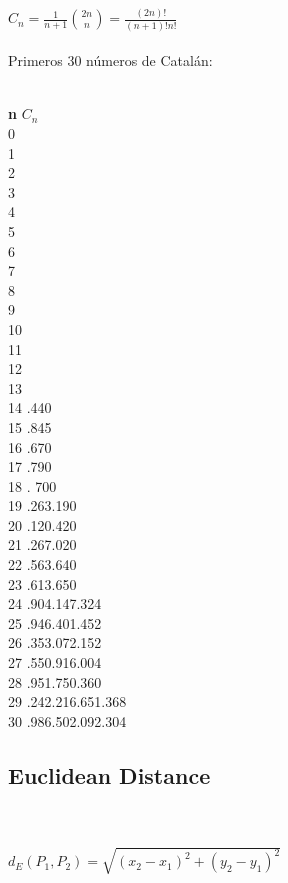 \documentclass[11pt,letterpaper,twocolumn,twosided]{article}
\begin{document}
{\LARGE $C_{n} = \frac{1}{n+1}\binom{2n}{n} = \frac{(2n)!}{(n+1)!n!}$}
\\ \\
Primeros 30 n\'umeros de Catal\'an:
\\ \\
\begin{tabbing}
\textbf{n}\hspace{3cm} \=  \textbf{$C_{n}$}\hspace{4cm}  \\ 
0  \\ 
1  \\ 
2  \\ 
3  \\ 
4  \\ 
5  \\ 
6  \\ 
7  \\ 
8 \\ 
9 \\ 
10 \\ 
11 \\
12 \\
13 \\ 
14 .440\\ 
15 .845\\ 
16 .670\\
17 .790\\
18 . 700\\
19 .263.190\\
20 .120.420\\ 
21 .267.020\\
22 .563.640\\ 
23 .613.650\\ 
24 .904.147.324\\
25 .946.401.452\\ 
26 .353.072.152\\ 
27 .550.916.004\\ 
28 .951.750.360\\ 
29 .242.216.651.368\\
30 .986.502.092.304\\ 
\end{tabbing}


\subsection{Euclidean Distance}
\\ \\
$ d_{E}(P_{1},P_{2}) = \sqrt{(x_{2}-x_{1})^{2}+(y_{2}-y_{1})^{2}} $
\\ \\
\end{document}

